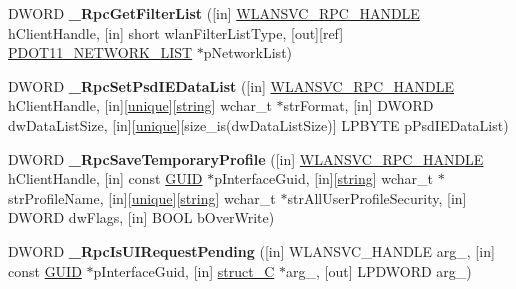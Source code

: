 \begin{DoxyCompactItemize}
\item 
\mbox{\label{interfacewlansvc__interface_a858c8e6cf4c756b9996cdcd87ab79b7f}} 
D\+W\+O\+RD {\bfseries \+\_\+\+Rpc\+Get\+Filter\+List} (\mbox{[}in\mbox{]} \hyperlink{interfacevoid}{W\+L\+A\+N\+S\+V\+C\+\_\+\+R\+P\+C\+\_\+\+H\+A\+N\+D\+LE} h\+Client\+Handle, \mbox{[}in\mbox{]} short wlan\+Filter\+List\+Type, \mbox{[}out\mbox{]}\mbox{[}ref\mbox{]} \hyperlink{struct___d_o_t11___n_e_t_w_o_r_k___l_i_s_t}{P\+D\+O\+T11\+\_\+\+N\+E\+T\+W\+O\+R\+K\+\_\+\+L\+I\+ST} $\ast$p\+Network\+List)
\item 
\mbox{\label{interfacewlansvc__interface_a3872aa1dd1910fe6a897d64734e7fa9c}} 
D\+W\+O\+RD {\bfseries \+\_\+\+Rpc\+Set\+Psd\+I\+E\+Data\+List} (\mbox{[}in\mbox{]} \hyperlink{interfacevoid}{W\+L\+A\+N\+S\+V\+C\+\_\+\+R\+P\+C\+\_\+\+H\+A\+N\+D\+LE} h\+Client\+Handle, \mbox{[}in\mbox{]}\mbox{[}\hyperlink{interfaceunique}{unique}\mbox{]}\mbox{[}\hyperlink{structstring}{string}\mbox{]} wchar\+\_\+t $\ast$str\+Format, \mbox{[}in\mbox{]} D\+W\+O\+RD dw\+Data\+List\+Size, \mbox{[}in\mbox{]}\mbox{[}\hyperlink{interfaceunique}{unique}\mbox{]}\mbox{[}size\+\_\+is(dw\+Data\+List\+Size)\mbox{]} L\+P\+B\+Y\+TE p\+Psd\+I\+E\+Data\+List)
\item 
\mbox{\label{interfacewlansvc__interface_a20a5aebb67154d8d4e02227e9c06e9b5}} 
D\+W\+O\+RD {\bfseries \+\_\+\+Rpc\+Save\+Temporary\+Profile} (\mbox{[}in\mbox{]} \hyperlink{interfacevoid}{W\+L\+A\+N\+S\+V\+C\+\_\+\+R\+P\+C\+\_\+\+H\+A\+N\+D\+LE} h\+Client\+Handle, \mbox{[}in\mbox{]} const \hyperlink{interface_g_u_i_d}{G\+U\+ID} $\ast$p\+Interface\+Guid, \mbox{[}in\mbox{]}\mbox{[}\hyperlink{structstring}{string}\mbox{]} wchar\+\_\+t $\ast$str\+Profile\+Name, \mbox{[}in\mbox{]}\mbox{[}\hyperlink{interfaceunique}{unique}\mbox{]}\mbox{[}\hyperlink{structstring}{string}\mbox{]} wchar\+\_\+t $\ast$str\+All\+User\+Profile\+Security, \mbox{[}in\mbox{]} D\+W\+O\+RD dw\+Flags, \mbox{[}in\mbox{]} B\+O\+OL b\+Over\+Write)
\item 
\mbox{\label{interfacewlansvc__interface_a5e8a9ea3b7959c490c75c7cebfa63783}} 
D\+W\+O\+RD {\bfseries \+\_\+\+Rpc\+Is\+U\+I\+Request\+Pending} (\mbox{[}in\mbox{]} W\+L\+A\+N\+S\+V\+C\+\_\+\+H\+A\+N\+D\+LE arg\+\_, \mbox{[}in\mbox{]} const \hyperlink{interface_g_u_i_d}{G\+U\+ID} $\ast$p\+Interface\+Guid, \mbox{[}in\mbox{]} \hyperlink{structstruct___c}{struct\+\_\+C} $\ast$arg\+\_, \mbox{[}out\mbox{]} L\+P\+D\+W\+O\+RD arg\+\_)

\end{DoxyCompactItemize}
